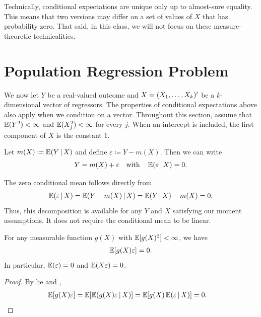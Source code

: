 \documentclass[a4paper,12pt]{article}
\begin{document}
\begin{remark}[``Unique'']
	Technically, conditional expectations are unique only up to almost-sure equality.
	This means that two versions may differ on a set of values of $X$ that has probability zero.
	That said, in this class, we will not focus on these measure-theoretic technicalities.
\end{remark}

\section{Population Regression Problem}

We now let $Y$ be a real-valued outcome and $X=(X_1,\ldots,X_k)^{\prime}$ be a $k$-dimensional vector of regressors.
The properties of conditional expectations above also apply when we condition on a vector.
Throughout this section, assume that $\operatorname{\mathbb{E}}(Y^2)<\infty$ and $\operatorname{\mathbb{E}}(X_j^2)<\infty$ for every $j$.
When an intercept is included, the first component of $X$ is the constant $1$.

\begin{definition}\label{def-conditional-mean-decomposition}
	Let $m(X)\coloneqq\operatorname{\mathbb{E}}(Y\mathpunct{}|\mathpunct{} X)$ and define $\varepsilon\coloneqq Y-m(X)$.
	Then we can write
	\begin{align}
		Y = m(X) + \varepsilon
		\quad\text{with}\quad
		\operatorname{\mathbb{E}}(\varepsilon\mathpunct{}|\mathpunct{} X)=0.
	\end{align}
\end{definition}

\begin{remark}
	The zero conditional mean follows directly from
	\begin{align}
		\operatorname{\mathbb{E}}(\varepsilon\mathpunct{}|\mathpunct{} X)
		= \operatorname{\mathbb{E}}(Y-m(X)\mathpunct{}|\mathpunct{} X)
		= \operatorname{\mathbb{E}}(Y\mathpunct{}|\mathpunct{} X)-m(X)=0.
	\end{align}
	Thus, this decomposition is available for any $Y$ and $X$ satisfying our moment assumptions.
	It does not require the conditional mean to be linear.
\end{remark}

\begin{proposition}\label{prop-conditional-mean-orthogonality}
	For any measurable function $g(X)$ with $\operatorname{\mathbb{E}}[g(X)^2]<\infty$, we have
	\begin{align}
		\operatorname{\mathbb{E}}[g(X)\varepsilon]=0.
	\end{align}
	In particular, $\operatorname{\mathbb{E}}(\varepsilon)=0$ and $\operatorname{\mathbb{E}}(X\varepsilon)=0$.
\end{proposition}
\begin{proof}
	By \gls{lie} and ,
	\begin{align*}
		\operatorname{\mathbb{E}}[g(X)\varepsilon]
		&= \operatorname{\mathbb{E}}[\operatorname{\mathbb{E}}(g(X)\varepsilon\mathpunct{}|\mathpunct{} X)]
		=\operatorname{\mathbb{E}}[g(X)\operatorname{\mathbb{E}}(\varepsilon\mathpunct{}|\mathpunct{} X)]=0.
		\qedhere
	\end{align*}
\end{proof}
\end{document}
